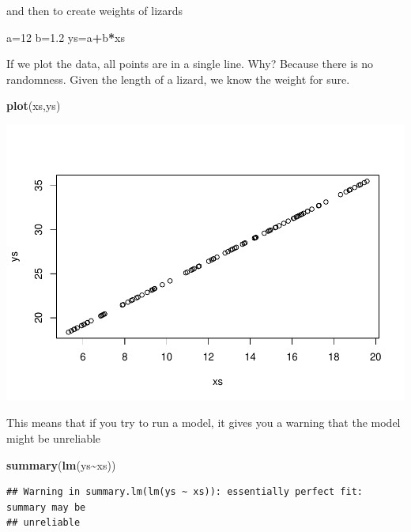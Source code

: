 \documentclass[
]{book}
\newenvironment{Shaded}{\begin{snugshade}}{\end{snugshade}}
\newcommand{\DecValTok}[1]{\textcolor[rgb]{0.00,0.00,0.81}{#1}}
\newcommand{\FloatTok}[1]{\textcolor[rgb]{0.00,0.00,0.81}{#1}}
\newcommand{\FunctionTok}[1]{\textcolor[rgb]{0.13,0.29,0.53}{\textbf{#1}}}
\newcommand{\NormalTok}[1]{#1}
\newcommand{\OtherTok}[1]{\textcolor[rgb]{0.56,0.35,0.01}{#1}}
\newcommand{\SpecialCharTok}[1]{\textcolor[rgb]{0.81,0.36,0.00}{\textbf{#1}}}
\begin{document}
and then to create weights of lizards

\begin{Shaded}
\begin{Highlighting}[]
\NormalTok{a}\OtherTok{=}\DecValTok{12}
\NormalTok{b}\OtherTok{=}\FloatTok{1.2}
\NormalTok{ys}\OtherTok{=}\NormalTok{a}\SpecialCharTok{+}\NormalTok{b}\SpecialCharTok{*}\NormalTok{xs}
\end{Highlighting}
\end{Shaded}

If we plot the data, all points are in a single line. Why? Because there is no randomness. Given the length of a lizard, we know the weight for sure.

\begin{Shaded}
\begin{Highlighting}[]
\FunctionTok{plot}\NormalTok{(xs,ys)}
\end{Highlighting}
\end{Shaded}

\includegraphics{ECOMODbook_files/figure-latex/a6.23-1.pdf}

This means that if you try to run a model, it gives you a warning that the model might be unreliable

\begin{Shaded}
\begin{Highlighting}[]
\FunctionTok{summary}\NormalTok{(}\FunctionTok{lm}\NormalTok{(ys}\SpecialCharTok{\textasciitilde{}}\NormalTok{xs))}
\end{Highlighting}
\end{Shaded}

\begin{verbatim}
## Warning in summary.lm(lm(ys ~ xs)): essentially perfect fit: summary may be
## unreliable
\end{verbatim}
\end{document}
